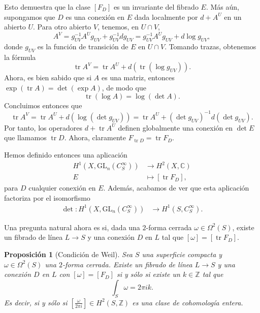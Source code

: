 \documentclass[12pt,a4paper]{article}
\newtheorem{prop}[thm]{Proposición}
\theoremstyle{definition} \newtheorem{defn}[thm]{Definición}
\theoremstyle{definition} \newtheorem{ejemplo}[thm]{Ejemplo}
\theoremstyle{definition} \newtheorem{ejercicio}[thm]{Ejercicio}
\def\CC{\mathbb{C}}
\def\GL{\mathrm{GL}}
\DeclareMathOperator{\tr}{tr}
\begin{document}
Esto demuestra que la clase $[F_D]$ es un invariante del fibrado $E$. Más aún, supongamos que $D$ es una conexión en $E$ dada localmente por $d+A^U$ en un abierto $U$. Para otro abierto $V$, tenemos, en $U\cap V$,
 \begin{equation*}
   A^V = g_{UV}^{-1} A^U g_{UV} + g_{UV}^{-1} dg_{UV} = g_{UV}^{-1} A^U g_{UV} + d\log g_{UV},
 \end{equation*}
 donde $g_{UV}$ es la función de transición de $E$ en $U\cap V$. Tomando trazas, obtenemos la fórmula
 \begin{equation*}
   \tr A^V = \tr A^U + d(\tr (\log g_{UV})).
 \end{equation*}
 Ahora, es bien sabido que si $A$ es una matriz, entonces $\exp(\tr A) = \det(\exp A)$, de modo que
 \begin{equation*}
   \tr(\log A) = \log (\det A).
 \end{equation*}
 Concluimos entonces que
 \begin{equation*}
   \tr A^V = \tr A^U + d(\log (\det g_{UV})) = \tr A^U + (\det g_{UV})^{-1} d(\det g_{UV}).
 \end{equation*}
 Por tanto, los operadores $d+\tr A^U$ definen globalmente una conexión en $\det E$ que llamamos $\tr D$. Ahora, claramente $F_{\tr D} = \tr F_D$.

 Hemos definido entonces una aplicación
 \begin{align*}
    H^1(X,\GL_n(C^\infty_S))&\longrightarrow H^2(X,\CC)\\ 
    E &\longmapsto [\tr F_D], 
   \end{align*}
   para $D$ cualquier conexión en $E$. Además, acabamos de ver que esta aplicación factoriza por el isomorfismo
   \begin{align*}
     \det :H^1(X,\GL_n(C^\infty_S)) &\longrightarrow H^1(S,C^\infty_S).
     \end{align*}

     Una pregunta natural ahora es si, dada una $2$-forma cerrada $\omega\in \Omega^2(S)$, existe un fibrado de línea $L\rightarrow S$ y una conexión $D$ en $L$ tal que $[\omega] = [\tr F_D]$. 

     \begin{prop}[Condición de Weil]
  Sea $S$ una superficie compacta y $\omega \in \Omega^2(S)$ una $2$-forma cerrada. Existe un fibrado de línea $L\rightarrow S$ y una conexión $D$ en $L$ con $[\omega]=[F_D]$ si y sólo si existe un $k\in \mathbb{Z}$ tal que
  \begin{equation*}
    \int_S \omega = 2\pi i k.
  \end{equation*}
  Es decir, si y sólo si $[\tfrac{\omega}{2\pi i}] \in H^2(S,\mathbb{Z})$ es una clase de cohomología entera.
\end{prop}
\end{document}
